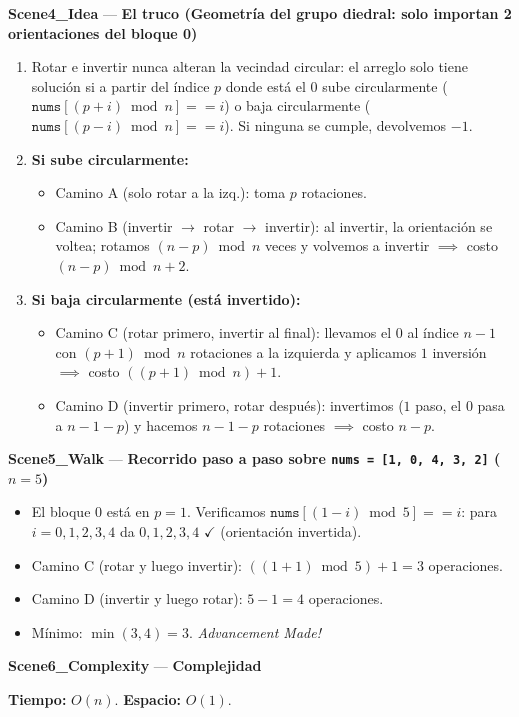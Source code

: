 \documentclass[letterpaper,10pt]{article}
\newcommand{\scene}[2]{\noindent\textbf{\textcolor{mcaqua}{#1}} --- \textbf{#2}\par\vspace{1pt}}
\begin{document}
\begin{shaded}
\scene{Scene4\_Idea}{El truco (Geometr\'ia del grupo diedral: solo importan 2 orientaciones del bloque 0)}
\begin{enumerate}\setlength{\itemsep}{1pt}
  \item Rotar e invertir nunca alteran la vecindad circular: el arreglo solo tiene soluci\'on si a partir del \'indice $p$ donde est\'a el $0$ sube circularmente ($\texttt{nums}[(p+i)\bmod n] == i$) o baja circularmente ($\texttt{nums}[(p-i)\bmod n] == i$). Si ninguna se cumple, devolvemos $-1$.
  \item \textbf{Si sube circularmente:}
  \begin{itemize}\setlength{\itemsep}{1pt}
    \item Camino A (solo rotar a la izq.): toma $p$ rotaciones.
    \item Camino B (invertir $\to$ rotar $\to$ invertir): al invertir, la orientaci\'on se voltea; rotamos $(n - p) \bmod n$ veces y volvemos a invertir $\implies$ costo $(n - p) \bmod n + 2$.
  \end{itemize}
  \item \textbf{Si baja circularmente (est\'a invertido):}
  \begin{itemize}\setlength{\itemsep}{1pt}
    \item Camino C (rotar primero, invertir al final): llevamos el $0$ al \'indice $n-1$ con $(p + 1) \bmod n$ rotaciones a la izquierda y aplicamos $1$ inversi\'on $\implies$ costo $((p + 1) \bmod n) + 1$.
    \item Camino D (invertir primero, rotar despu\'es): invertimos ($1$ paso, el $0$ pasa a $n - 1 - p$) y hacemos $n - 1 - p$ rotaciones $\implies$ costo $n - p$.
  \end{itemize}
\end{enumerate}

\scene{Scene5\_Walk}{Recorrido paso a paso sobre \texttt{nums = [1, 0, 4, 3, 2]} ($n = 5$)}
\begin{itemize}\setlength{\itemsep}{1pt}
  \item El bloque $0$ est\'a en $p = 1$. Verificamos $\texttt{nums}[(1 - i) \bmod 5] == i$: para $i=0,1,2,3,4$ da $0, 1, 2, 3, 4$ $\checkmark$ (orientaci\'on invertida).
  \item Camino C (rotar y luego invertir): $((1 + 1) \bmod 5) + 1 = 3$ operaciones.
  \item Camino D (invertir y luego rotar): $5 - 1 = 4$ operaciones.
  \item M\'inimo: $\min(3, 4) = 3$. \textit{Advancement Made!}
\end{itemize}

\scene{Scene6\_Complexity}{Complejidad}
\textbf{Tiempo:} $O(n)$. \quad \textbf{Espacio:} $O(1)$.
\end{shaded}
\end{document}
